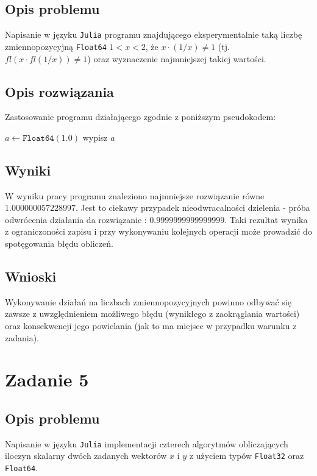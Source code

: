 \documentclass{classrep}
\begin{document}
	\subsection{Opis problemu}
		Napisanie w języku \texttt{Julia} programu znajdującego eksperymentalnie taką liczbę zmiennopozycyjną 
		\texttt{Float64} $1<x<2$, że $x\cdot(1/x)\neq1$ (tj. $fl(x\cdot fl(1/x))\neq1$) oraz wyznaczenie najmniejszej takiej
		wartości.
	\subsection{Opis rozwiązania}
		Zastosowanie programu działającego zgodnie z poniższym pseudokodem:
		\begin{algorithm}
		\begin{algorithmic}
			\State $a\gets \texttt{Float64}(1.0)$
					wypisz $a$
				\EndIf
			\EndWhile
		\end{algorithmic}
		\caption{}
		\end{algorithm}
		
	\subsection{Wyniki}
		W wyniku pracy programu znaleziono najmniejsze rozwiązanie równe \\ $1.000000057228997$.
		Jest to ciekawy przypadek nieodwracalności dzielenia - próba odwrócenia działania da rozwiązanie : $0.9999999999999999$.
		Taki rezultat wynika z ograniczoności zapisu i przy wykonywaniu kolejnych operacji może prowadzić do spotęgowania błędu obliczeń.
	\subsection{Wnioski}
		Wykonywanie działań na liczbach zmiennopozycyjnych powinno odbywać się zawsze z uwzględnieniem możliwego błędu (wynikłego z zaokrąglania wartości) 
		oraz konsekwencji jego powielania (jak to ma miejsce w przypadku warunku z zadania).
\section{Zadanie 5}
	\subsection{Opis problemu}
		Napisanie w języku \texttt{Julia} implementacji czterech algorytmów obliczających iloczyn skalarny dwóch 
		zadanych wektorów $x$ i $y$ z użyciem typów \texttt{Float32} oraz \texttt{Float64}.
\end{document}

